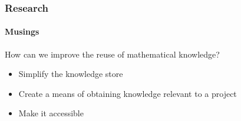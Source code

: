 \documentclass{beamer}
\begin{document}




\begin{frame}

\frametitle{Research}
\framesubtitle{Musings}

How can we improve the reuse of mathematical knowledge? 
\begin{itemize}
\item Simplify the knowledge store
\item Create a means of obtaining knowledge relevant to a project
\item Make it accessible %
\end{itemize}

\end{frame}

\end{document}
